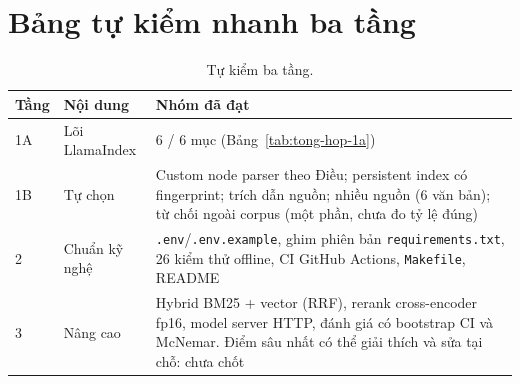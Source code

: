 \chapter{Bảng tự kiểm nhanh ba tầng}
\label{app:tu-kiem}

\begin{table}[H]
  \centering
  \small
  \begin{tabularx}{\textwidth}{l l X}
    \toprule
    \textbf{Tầng} & \textbf{Nội dung} & \textbf{Nhóm đã đạt} \\
    \midrule
    1A & Lõi LlamaIndex & 6 / 6 mục (Bảng~\ref{tab:tong-hop-1a}) \\
    1B & Tự chọn & Custom node parser theo Điều; persistent index có fingerprint; trích dẫn nguồn;
                    nhiều nguồn (6 văn bản); từ chối ngoài corpus (một phần, chưa đo tỷ lệ đúng) \\
    2 & Chuẩn kỹ nghệ & \texttt{.env}/\texttt{.env.example}, ghim phiên bản \texttt{requirements.txt}, 26 kiểm
                        thử offline, CI GitHub Actions, \texttt{Makefile}, README \\
    3 & Nâng cao & Hybrid BM25 + vector (RRF), rerank cross-encoder fp16, model server HTTP, đánh giá có
                   bootstrap CI và McNemar. Điểm sâu nhất có thể giải thích và sửa tại chỗ:
                   chưa chốt \\
    \bottomrule
  \end{tabularx}
  \caption{Tự kiểm ba tầng.}
\end{table}
